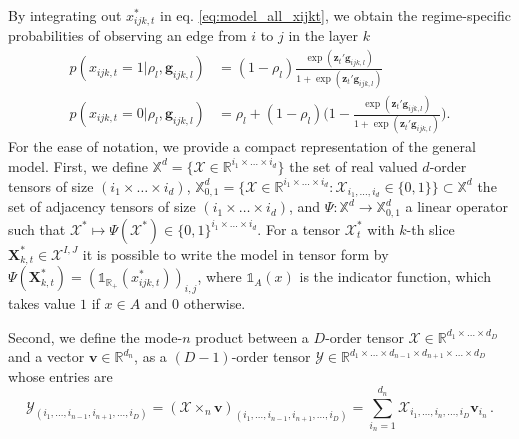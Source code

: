 \documentclass[12pt,a4paper]{article}
\def \I{\mathds{1}}
\def \R{\mathds{R}}
\theoremstyle{custom}
\begin{document}
By integrating out $x_{ijk,t}^*$ in eq. \eqref{eq:model_all_xijkt}, we obtain the regime-specific probabilities of observing an edge from $i$ to $j$ in the layer $k$
\begin{align}
p(x_{ijk,t} = 1 | \rho_l,\mathbf{g}_{ijk,l}) & = (1-\rho_l) \frac{\exp( \mathbf{z}_t' \mathbf{g}_{ijk,l})}{1+\exp( \mathbf{z}_t' \mathbf{g}_{ijk,l})} \\
p(x_{ijk,t} = 0 | \rho_l,\mathbf{g}_{ijk,l}) & = \rho_l + (1-\rho_l) \bigg( 1-\frac{\exp( \mathbf{z}_t' \mathbf{g}_{ijk,l})}{1+\exp( \mathbf{z}_t' \mathbf{g}_{ijk,l})} \bigg).
\end{align}
For the ease of notation, we provide a compact representation of the general model. First, we define $\mathbb{X}^{d} = \lbrace \mathcal{X}\in \R^{i_1\times\ldots\times i_d} \rbrace$ the set of real valued $d$-order tensors of size $(i_1\times\ldots\times i_d)$, $\mathbb{X}_{0,1}^{d} = \lbrace  \mathcal{X}\in \R^{i_1\times\ldots\times i_d} : \mathcal{X}_{i_1,\ldots,i_d} \in \lbrace 0,1 \rbrace \rbrace \subset \mathbb{X}^{d}$ the set of adjacency tensors of size $(i_1\times\ldots\times i_d)$, and $\Psi : \mathbb{X}^{d} \rightarrow \mathbb{X}_{0,1}^{d}$ a linear operator such that $\mathcal{X}^* \mapsto \Psi(\mathcal{X}^*) \in \lbrace 0,1 \rbrace^{i_1\times\ldots\times i_d}$. 
For a tensor $\mathcal{X}_t^*$ with $k$-th slice $\mathbf{X}_{k,t}^* \in\mathcal{X}^{I,J}$ it is possible to write the model in tensor form by $\Psi(\mathbf{X}_{k,t}^*) = (\I_{\R_+}(x_{ijk,t}^*))_{i,j}$, where $\I_A (x)$ is the indicator function, which takes value $1$ if $x\in A$ and $0$ otherwise.

Second, we define the mode-$n$ product between a $D$-order tensor $\mathcal{X}\in\R^{d_1\times\ldots\times d_D}$ and a vector $\mathbf{v}\in\R^{d_n}$, as a $(D-1)$-order tensor $\mathcal{Y}\in\R^{d_1\times\ldots\times d_{n-1}\times d_{n+1}\times\ldots\times d_D}$ whose entries are
\begin{equation}
\mathcal{Y}_{(i_1,\ldots,i_{n-1},i_{n+1},\ldots,i_D)} = (\mathcal{X} \times_n \mathbf{v})_{(i_1,\ldots,i_{n-1},i_{n+1},\ldots,i_D)} = \sum_{i_n=1}^{d_n} \mathcal{X}_{i_1,\ldots,i_n,\ldots,i_D} \mathbf{v}_{i_n} \, .
\label{eq:tensor_moden_vector}
\end{equation}
\end{document}
